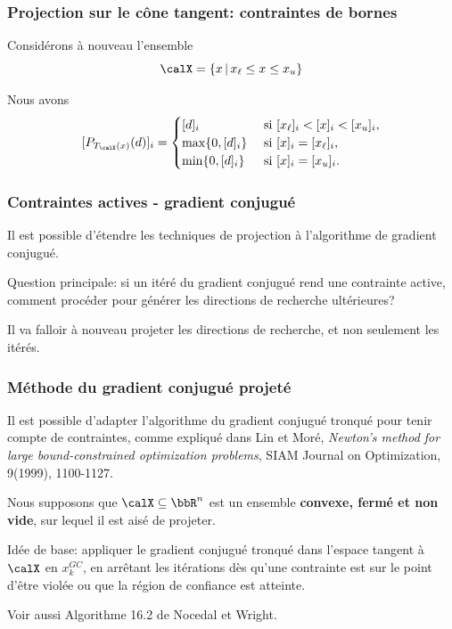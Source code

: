 \documentclass[t,aspectratio=169,usepdftitle=false]{beamer}
\def\cX{\calX}
\begin{document}
\begin{frame}
\frametitle{Projection sur le cône tangent: contraintes de bornes}

Considérons à nouveau l'ensemble
$$
\cX = \lbrace x \,|\, x_{\ell} \leq x \leq x_u \rbrace
$$

\mbox{}

Nous avons
$$
[P_{T_{\cX}(x)}(d)]_i =
\begin{cases}
[d]_i & \mbox{ si } [x_{\ell}]_i < [x]_i < [x_u]_i, \\
\max\{0, [d]_i\} & \mbox{ si } [x]_i = [x_{\ell}]_i, \\
\min\{0, [d]_i\} & \mbox{ si } [x]_i = [x_u]_i.
\end{cases}
$$

\end{frame}

\begin{frame}
	\frametitle{Contraintes actives - gradient conjugué}
	
	Il est possible d'étendre les techniques de projection à l'algorithme de gradient conjugué.
	
	\mbox{}
	
	Question principale: si un itéré du gradient conjugué rend une contrainte active, comment procéder pour générer les directions de recherche ultérieures?
	
	\mbox{}
	
	Il va falloir à nouveau projeter les directions de recherche, et non seulement les itérés.
	
\end{frame}

\begin{frame}
\frametitle{Méthode du gradient conjugué projeté}

Il est possible d'adapter l'algorithme du gradient conjugué tronqué pour tenir compte de contraintes, comme expliqué dans Lin et Moré, {\sl Newton's method for large bound-constrained optimization problems}, SIAM Journal on Optimization, 9(1999), 1100-1127.

\mbox{}

Nous supposons que $\cX \subseteq \bbR^n$ est un ensemble \textbf{convexe, fermé et non vide}, sur lequel il est aisé de projeter.

\mbox{}

Idée de base: appliquer le gradient conjugué tronqué dans l'espace tangent à $\cX$ en $x_k^{GC}$, en arrêtant les itérations dès qu'une contrainte est sur le point d'être violée ou que la région de confiance est atteinte.

\mbox{}

Voir aussi Algorithme 16.2 de Nocedal et Wright.

\end{frame}
\end{document}
